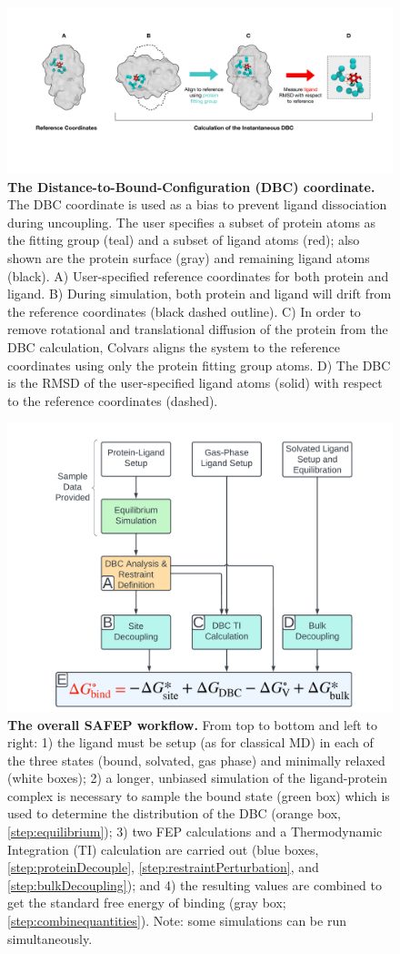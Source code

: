 \documentclass[9pt,tutorial,pubversion]{Styling/livecoms}
\begin{document}
\onecolumn
\begin{figure}[h]
    \centering
    \includegraphics[width=\textwidth]{DBCfigfinal.pdf}
    \caption{\textbf{The Distance-to-Bound-Configuration (DBC) coordinate.} The DBC coordinate is used as a bias to prevent ligand dissociation during uncoupling. The user specifies a subset of protein atoms as the fitting group (teal) and a subset of ligand atoms (red); also shown are the protein surface (gray) and remaining ligand atoms (black). A) User-specified reference coordinates for both protein and ligand.
    B) During simulation, both protein and ligand will drift from the reference coordinates (black dashed outline).
    C) In order to remove rotational and translational diffusion of the protein from the DBC calculation, Colvars aligns the system to the reference coordinates using only the protein fitting group atoms. 
    D) The DBC is the RMSD of the user-specified ligand atoms (solid) with respect to the reference coordinates (dashed).}
    \label{fig:DBC}
\end{figure}


\begin{figure}[!h]
    \centering
    \includegraphics[width=0.5\linewidth, trim={3cm 0 2cm 0},clip]{CoarseGrainedWorkflow.pdf}
    \caption[test]{\textbf{The overall SAFEP workflow.} From top to bottom and left to right: 1) the ligand must be setup (as for classical MD) in each of the three states (bound, solvated, gas phase) and minimally relaxed (white boxes); 2) a longer, unbiased simulation of the ligand-protein complex is necessary to sample the bound state (green box) which is used to determine the distribution of the DBC (orange box, \ref{step:equilibrium}); 3) two FEP calculations and a Thermodynamic Integration (TI) calculation are carried out (blue boxes, \ref{step:proteinDecouple}, \ref{step:restraintPerturbation}, and \ref{step:bulkDecoupling}); and 4) the resulting values are combined to get the standard free energy of binding (gray box; \ref{step:combinequantities}). Note: some simulations can be run simultaneously.}
    \label{fig:workflow}
\end{figure}
\end{document}

